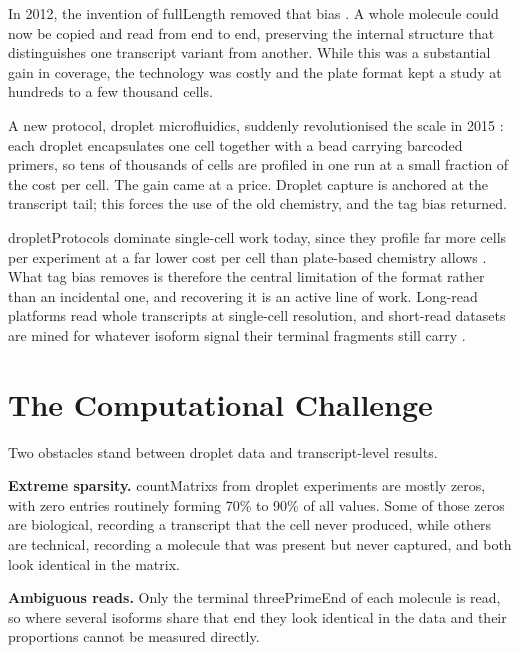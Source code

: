 In 2012, the invention of \gls{fullLength} removed that bias \cite{ramskold2012full, picelli2013smart}. A whole molecule could now be copied and read from end to end, preserving the internal structure that distinguishes one transcript variant from another. While this was a substantial gain in coverage, the technology was costly and the plate format kept a study at hundreds to a few thousand cells.

A new protocol, droplet microfluidics, suddenly revolutionised the scale in 2015 \cite{zheng2017massively}: each droplet encapsulates one cell together with a bead carrying barcoded primers, so tens of thousands of cells are profiled in one run at a small fraction of the cost per cell. The gain came at a price. Droplet capture is anchored at the transcript tail; this forces the use of the old chemistry, and the tag bias returned.

\Gls{dropletProtocols} dominate single-cell work today, since they profile far more cells per experiment at a far lower cost per cell than plate-based chemistry allows \cite{conte2024opportunities}. What tag bias removes is therefore the central limitation of the format rather than an incidental one, and recovering it is an active line of work. Long-read platforms read whole transcripts at single-cell resolution, and short-read datasets are mined for whatever isoform signal their terminal fragments still carry \cite{joglekar2023words}.

\section{The Computational Challenge}
Two obstacles stand between droplet data and transcript-level results.

\textbf{Extreme \gls{sparsity}.} \Glspl{countMatrix} from droplet experiments are mostly zeros, with zero entries routinely forming 70\% to 90\% of all values. Some of those zeros are biological, recording a transcript that the cell never produced, while others are technical, recording a molecule that was present but never captured, and both look identical in the matrix.

\textbf{Ambiguous reads.} Only the terminal \gls{threePrimeEnd} of each molecule is read, so where several \glspl{isoform} share that end they look identical in the data and their proportions cannot be measured directly.

